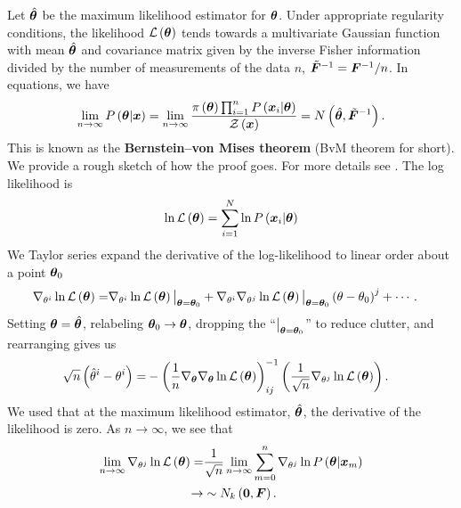 Let $\hat{{\bm \theta}}$ be the maximum likelihood estimator for ${\bm \theta}$.
Under appropriate regularity conditions,
the likelihood $\mathcal{L}\left({\bm \theta}\right)$ 
tends towards a multivariate Gaussian function with mean $\hat{{\bm \theta}}$ and 
covariance matrix given by the inverse Fisher information divided by the number of measurements of the data $n$, 
$\tilde{{\bm F}}^{-1}={\bm F}^{-1}/n$. 
In equations, we have
\begin{align}
    \lim_{n\to\infty}P\left({\bm \theta}|{\bm x}\right)
    =
    \lim_{n\to\infty}\frac{\pi\left({\bm \theta}\right)\prod_{i=1}^nP\left({\bm x}_i|{\bm \theta}\right)}{\mathcal{Z}\left({\bm x}\right)}
    =
    N\left(\hat{{\bm \theta}},\tilde{{\bm F}}^{-1}\right)
    .
\end{align}
This is known as the \textbf{Bernstein–von Mises theorem} (BvM theorem for short). 
We provide a rough sketch of how the proof goes. 
For more details see \cite{wasserman2010statistics}.
The log likelihood is
\begin{align}
    \ln\mathcal{L}\left({\bm \theta}\right)
    =
    \sum_{i=1}^N\ln P\left({\bm x}_{i}|{\bm \theta}\right)
\end{align}
We Taylor series expand the derivative of the log-likelihood to linear order about a point 
${\bm \theta}_0$
\begin{align}
    \nabla_{\theta^i}\ln\mathcal{L}\left({\bm \theta}\right)
    =&
    \nabla_{\theta^i}\ln\mathcal{L}\left({\bm \theta}\right)\big|_{{\bm \theta}={\bm \theta}_0}
    +
    \nabla_{\theta^i}\nabla_{\theta^j}\ln\mathcal{L}\left({\bm \theta}\right)\big|_{{\bm \theta}={\bm \theta}_0}
    \left(\theta-\theta_0\right)^j
    +
    \cdots
    .
\end{align}
Setting ${\bm \theta}=\hat{{\bm \theta}}$, relabeling ${\bm \theta}_0\to{\bm \theta}$, 
dropping the ``$\big|_{{\bm \theta}={\bm \theta}_0}$'' to reduce clutter, and rearranging gives us 
\begin{align}
    \sqrt{n}\left(\hat{\theta}^i - \theta^i\right)
    =&
    -
    \left(\frac{1}{n}\nabla_{{\bm \theta}}\nabla_{{\bm \theta}}\ln\mathcal{L}\left({\bm \theta}\right)\right)^{-1}_{ij}
    \left(\frac{1}{\sqrt{n}}\nabla_{\theta^j}\ln\mathcal{L}\left({\bm \theta}\right)\right)
    .
\end{align}
We used that at the maximum likelihood estimator, $\hat{{\bm \theta}}$, the derivative of the likelihood is zero.
As $n\to\infty$, we see that
\begin{align}
    \lim_{n\to\infty}\nabla_{\theta^j}\ln\mathcal{L}\left({\bm \theta}\right)
    =&
    \frac{1}{\sqrt{n}}\lim_{n\to\infty}\sum_{m=0}^n\nabla_{\theta^j}\ln P\left({\bm \theta}|{\bm x}_{m}\right)
    \nonumber\\
    \to & \sim
    N_k\left({\bm 0},{\bm F}\right)
    .
\end{align}
